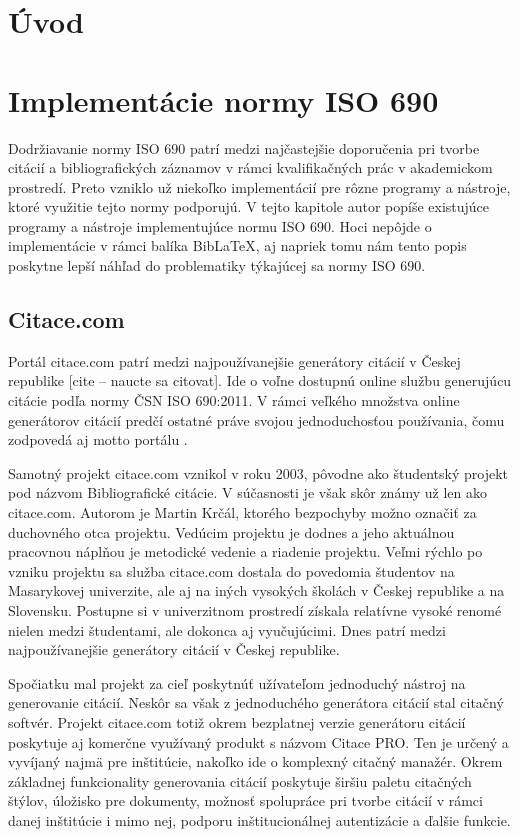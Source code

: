 \documentclass{fithesis3}
\begin{document}
\chapter{Úvod}

\chapter{Implementácie normy ISO 690}
Dodržiavanie normy ISO 690 patrí medzi najčastejšie doporučenia pri tvorbe citácií a bibliografických záznamov v rámci kvalifikačných prác v akademickom prostredí. Preto vzniklo už niekoľko implementácií pre rôzne programy a nástroje, ktoré využitie tejto normy podporujú. V tejto kapitole autor popíše existujúce programy a nástroje implementujúce normu ISO 690. Hoci nepôjde o implementácie v rámci balíka Bib\LaTeX, aj napriek tomu nám tento popis poskytne lepší náhľad do problematiky týkajúcej sa normy ISO 690.

	\section{Citace.com}
	Portál citace.com patrí medzi najpoužívanejšie generátory citácií v Českej republike [cite -- naucte sa citovat]. Ide o voľne dostupnú online službu generujúcu citácie podľa normy ČSN ISO 690:2011. V rámci veľkého množstva online generátorov citácií predčí ostatné práve svojou jednoduchosťou používania, čomu zodpovedá aj motto portálu .

	Samotný projekt citace.com vznikol v roku 2003, pôvodne ako študentský projekt pod názvom Bibliografické citácie. V súčasnosti je však skôr známy už len ako citace.com. Autorom je Martin Krčál, ktorého bezpochyby možno označiť za duchovného otca projektu. Vedúcim projektu je dodnes a jeho aktuálnou pracovnou náplňou je metodické vedenie a riadenie projektu. Veľmi rýchlo po vzniku projektu sa služba citace.com dostala do povedomia študentov na Masarykovej univerzite, ale aj na iných vysokých školách v Českej republike a na Slovensku. Postupne si v univerzitnom prostredí získala relatívne vysoké renomé nielen medzi študentami, ale dokonca aj vyučujúcimi. Dnes patrí medzi najpoužívanejšie generátory citácií v Českej republike.

	Spočiatku mal projekt za cieľ poskytnúť užívateľom jednoduchý nástroj na generovanie citácií. Neskôr sa však z jednoduchého generátora citácií stal citačný softvér. Projekt citace.com totiž okrem bezplatnej verzie generátoru citácií poskytuje aj komerčne využívaný produkt s názvom Citace PRO. Ten je určený a vyvíjaný najmä pre inštitúcie, nakoľko ide o komplexný citačný manažér. Okrem základnej funkcionality generovania citácií poskytuje širšiu paletu citačných štýlov, úložisko pre dokumenty, možnosť spolupráce pri tvorbe citácií v rámci danej inštitúcie i mimo nej, podporu inštitucionálnej autentizácie a ďalšie funkcie.
\end{document}
